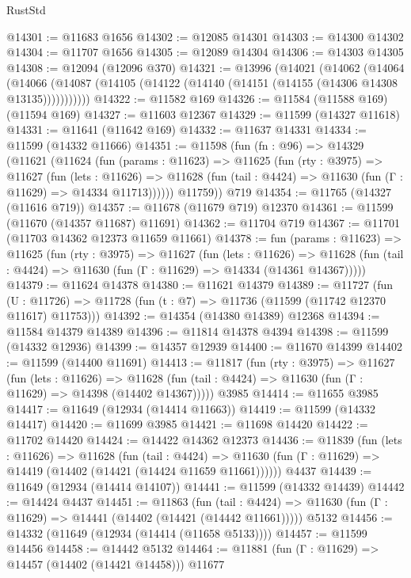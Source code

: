 \begin{lexlean}{RustStd}
\begin{coremodule}
@14301 := @11683 @1656
@14302 := @12085 @14301
@14303 := @14300 @14302
@14304 := @11707 @1656
@14305 := @12089 @14304
@14306 := @14303 @14305
@14308 := @12094 (@12096 @370)
@14321 := @13996
    (@14021
      (@14062
        (@14064
          (@14066 (@14087 (@14105 (@14122 (@14140 (@14151 (@14155 (@14306 @14308 @13135)))))))))))
@14322 := @11582 @169
@14326 := @11584 (@11588 @169) (@11594 @169)
@14327 := @11603 @12367
@14329 := @11599 (@14327 @11618)
@14331 := @11641 (@11642 @169)
@14332 := @11637 @14331
@14334 := @11599 (@14332 @11666)
@14351 := @11598
    (fun (fn : @96) =>
    @14329
      (@11621
        (@11624
          (fun (params : @11623) =>
          @11625
            (fun (rty : @3975) =>
            @11627
              (fun (lets : @11626) =>
              @11628 (fun (tail : @4424) => @11630 (fun (Γ : @11629) => @14334 @11713))))))
        @11759))
    @719
@14354 := @11765 (@14327 (@11616 @719))
@14357 := @11678 (@11679 @719) @12370
@14361 := @11599 (@11670 (@14357 @11687) @11691)
@14362 := @11704 @719
@14367 := @11701 (@11703 @14362 @12373 @11659 @11661)
@14378 := fun (params : @11623) =>
  @11625
    (fun (rty : @3975) =>
    @11627
      (fun (lets : @11626) =>
      @11628 (fun (tail : @4424) => @11630 (fun (Γ : @11629) => @14334 (@14361 @14367)))))
@14379 := @11624 @14378
@14380 := @11621 @14379
@14389 := @11727
    (fun (U : @11726) => @11728 (fun (t : @7) => @11736 (@11599 (@11742 @12370 @11617) @11753)))
@14392 := @14354 (@14380 @14389) @12368
@14394 := @11584 @14379 @14389
@14396 := @11814 @14378 @4394
@14398 := @11599 (@14332 @12936)
@14399 := @14357 @12939
@14400 := @11670 @14399
@14402 := @11599 (@14400 @11691)
@14413 := @11817
    (fun (rty : @3975) =>
    @11627
      (fun (lets : @11626) =>
      @11628 (fun (tail : @4424) => @11630 (fun (Γ : @11629) => @14398 (@14402 @14367)))))
    @3985
@14414 := @11655 @3985
@14417 := @11649 (@12934 (@14414 @11663))
@14419 := @11599 (@14332 @14417)
@14420 := @11699 @3985
@14421 := @11698 @14420
@14422 := @11702 @14420
@14424 := @14422 @14362 @12373
@14436 := @11839
    (fun (lets : @11626) =>
    @11628
      (fun (tail : @4424) =>
      @11630 (fun (Γ : @11629) => @14419 (@14402 (@14421 (@14424 @11659 @11661))))))
    @4437
@14439 := @11649 (@12934 (@14414 @14107))
@14441 := @11599 (@14332 @14439)
@14442 := @14424 @4437
@14451 := @11863
    (fun (tail : @4424) => @11630 (fun (Γ : @11629) => @14441 (@14402 (@14421 (@14442 @11661)))))
    @5132
@14456 := @14332 (@11649 (@12934 (@14414 (@11658 @5133))))
@14457 := @11599 @14456
@14458 := @14442 @5132
@14464 := @11881 (fun (Γ : @11629) => @14457 (@14402 (@14421 @14458))) @11677

\end{coremodule}
\end{lexlean}
